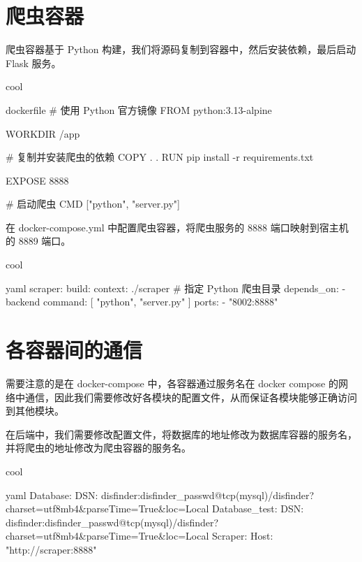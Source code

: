 \section{爬虫容器}

爬虫容器基于 Python 构建，我们将源码复制到容器中，然后安装依赖，最后启动 Flask 服务。

\begin{codebox}{}{cool}
\begin{amzcode}{dockerfile}
# 使用 Python 官方镜像
FROM python:3.13-alpine

WORKDIR /app

# 复制并安装爬虫的依赖
COPY . .
RUN pip install -r requirements.txt

EXPOSE 8888

# 启动爬虫
CMD ["python", "server.py"]
\end{amzcode}
\end{codebox}

在 docker-compose.yml 中配置爬虫容器，将爬虫服务的 8888 端口映射到宿主机的 8889 端口。

\begin{codebox}{}{cool}
\begin{amzcode}{yaml}
  scraper:
    build:
      context: ./scraper # 指定 Python 爬虫目录
    depends_on:
      - backend
    command: [ "python", "server.py" ]
    ports:
      - "8002:8888"
\end{amzcode}
\end{codebox}

\section{各容器间的通信}

需要注意的是在 docker-compose 中，各容器通过服务名在 docker compose 的网络中通信，因此我们需要修改好各模块的配置文件，从而保证各模块能够正确访问到其他模块。

在后端中，我们需要修改配置文件，将数据库的地址修改为数据库容器的服务名，并将爬虫的地址修改为爬虫容器的服务名。

\begin{codebox}{}{cool}
\begin{amzcode}{yaml}
Database:
  DSN: disfinder:disfinder_passwd@tcp(mysql)/disfinder?charset=utf8mb4&parseTime=True&loc=Local
Database_test:
  DSN: disfinder:disfinder_passwd@tcp(mysql)/disfinder?charset=utf8mb4&parseTime=True&loc=Local
Scraper:
  Host: "http://scraper:8888"
\end{amzcode}
\end{codebox}

